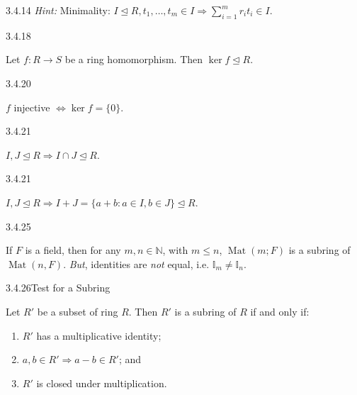 \documentclass[10pt]{article} %
\renewcommand{\leq}{\leqslant}
\DeclareMathOperator{\Mat}{Mat}
\newcommand{\Hint}{\vspace{0.2em}\textit{Hint: }}
\begin{document}
\begin{multicols}{3}
\begin{proposition}{3.4.14}{}
    \Hint Minimality: $I \unlhd R, t_1, \hdots, t_m \in I \Rightarrow \sum_{i=1}^m r_it_i \in I$.

\end{proposition}

\begin{proposition}{3.4.18}{}

    Let $f: R \to S$ be a ring homomorphism. Then $\ker{f} \unlhd R$.

\end{proposition}

\begin{lemma}{3.4.20}{}

    $f$ injective $\Leftrightarrow \ker{f} = \{0\}$.

\end{lemma}

\begin{lemma}{3.4.21}{}

    $I, J \unlhd R \Rightarrow I \cap J \unlhd R$.

\end{lemma}

\begin{lemma}{3.4.21}{}

    $I, J \unlhd R \Rightarrow I + J = \{a + b: a \in I, b \in J\} \unlhd R$.

\end{lemma}

\begin{example}{3.4.25}{}

    If $F$ is a field, then for any $m,n \in \mathbb{N}$, with $m \leq n$, $\Mat(m;F)$ is a subring of $\Mat(n,F)$. \emph{But}, identities are \emph{not} equal, i.e. $\mathbb{I}_m \neq \mathbb{I}_n$.

\end{example}

\begin{proposition}{3.4.26}{Test for a Subring}

    Let $R'$ be a subset of ring $R$. Then $R'$ is a subring of $R$ if and only if:

        \begin{enumerate}[(1)]
            \setlength{\parskip}{0em}
            \item $R'$ has a multiplicative identity;
            \item $a,b \in R' \Rightarrow a - b \in R'$; and
            \item $R'$ is closed under multiplication.
        \end{enumerate}


\end{proposition}
\end{multicols}
\end{document}
